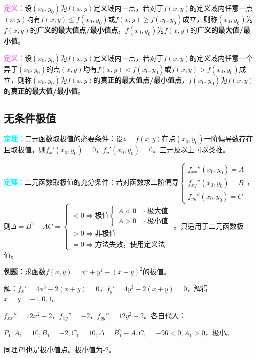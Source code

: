 \documentclass[UTF8, 12pt]{ctexart}
\begin{document}
\textcolor{violet}{\textbf{定义：}}设$(x_0,y_0)$为$f(x,y)$定义域内一点，若对于$f(x,y)$的定义域内任意一点$(x,y)$均有$f(x,y)\leqslant f(x_0,y_0)$或$f(x,y)\geqslant f(x_0,y_0)$成立，则称$(x_0,y_0)$为$f(x,y)$的\textbf{广义的最大值点/最小值点}，$f(x_0,y_0)$为$f(x,y)$的\textbf{广义的最大值/最小值}。

\textcolor{violet}{\textbf{定义：}}设$(x_0,y_0)$为$f(x,y)$定义域内一点，若对于$f(x,y)$的定义域内任意一个异于$(x_0,y_0)$的点$(x,y)$均有$f(x,y)<f(x_0,y_0)$或$f(x,y)>f(x_0,y_0)$成立，则称$(x_0,y_0)$为$f(x,y)$的\textbf{真正的最大值点/最小值点}，$f(x_0,y_0)$为$f(x,y)$的\textbf{真正的最大值/最小值}。

\subsection{无条件极值}

\textcolor{aqua}{\textbf{定理：}}二元函数取极值的必要条件：设$z=f(x,y)$在点$(x_0,y_0)$一阶偏导数存在且取极值，则$f_x'(x_0,y_0)=0$，$f_y'(x_0,y_0)=0$。三元及以上可以类推。

\textcolor{aqua}{\textbf{定理：}}二元函数取极值的充分条件：若对函数求二阶偏导$\left\{\begin{array}{l}
    f_{xx}''(x_0,y_0)=A \\
    f_{xy}''(x_0,y_0)=B \\
    f_{yy}''(x_0,y_0)=C
\end{array}\right.$，则$\Delta=B^2-AC=\left\{\begin{array}{l}
    <0\Rightarrow\text{极值}\left\{\begin{array}{l}
        A<0\Rightarrow\text{极大值} \\
        A>0\Rightarrow\text{极小值}
    \end{array}\right. \\
    >0\Rightarrow\text{非极值} \\
    =0\Rightarrow\text{方法失效，使用定义法}
\end{array}\right.$。只适用于二元函数极值。

\textbf{例题：}求函数$f(x,y)=x^4+y^4-(x+y)^2$的极值。

解：$f_x'=4x^3-2(x+y)=0$，$f_y'=4y^3-2(x+y)=0$，解得$x=y=-1,0,1$。

$f_{xx}''=12x^2-2$，$f_{xy}''=-2$，$f_{yy}''=12y^2-2$。各自代入：

$P_1:A_1=10,B_1=-2,C_1=10,\Delta=B_1^2-A_1C_1=-96<0,A_1>0$，极小。

同理$P3$也是极小值点。极小值为-2。
\end{document}
